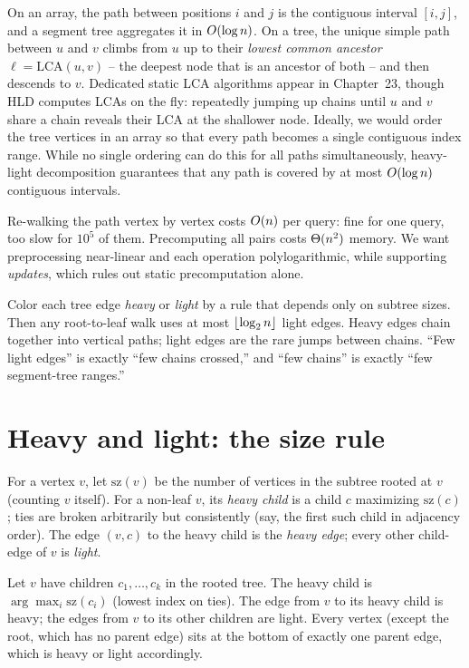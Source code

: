 \begin{intuitionbox}
On an array, the path between positions $i$ and $j$ is the contiguous interval $[i,j]$, and a segment tree aggregates it in $O(\log n)$. On a tree, the unique simple path between $u$ and $v$ climbs from $u$ up to their \emph{lowest common ancestor} $\ell=\mathrm{LCA}(u,v)$ -- the deepest node that is an ancestor of both -- and then descends to $v$. Dedicated static LCA algorithms appear in Chapter~23, though HLD computes LCAs on the fly: repeatedly jumping up chains until $u$ and $v$ share a chain reveals their LCA at the shallower node. Ideally, we would order the tree vertices in an array so that every path becomes a single contiguous index range. While no single ordering can do this for all paths simultaneously, heavy-light decomposition guarantees that any path is covered by at most $O(\log n)$ contiguous intervals.
\end{intuitionbox}

Re-walking the path vertex by vertex costs $O(n)$ per query: fine
for one query, too slow for $10^5$ of them. Precomputing all pairs costs $\Theta(n^2)$ memory. We want
preprocessing near-linear and each operation polylogarithmic, while supporting \emph{updates}, which
rules out static precomputation alone.

\begin{focusbox}
Color each tree edge \emph{heavy} or \emph{light} by
a rule that depends only on subtree sizes. Then any root-to-leaf walk uses at most
$\lfloor\log_2 n\rfloor$ light edges. Heavy edges chain together into vertical paths; light edges are the
rare jumps between chains. ``Few light edges'' is exactly ``few chains crossed,'' and ``few chains''
is exactly ``few segment-tree ranges.''
\end{focusbox}

\section{Heavy and light: the size rule}
\label{ch19:rule}

For a vertex $v$, let $\mathrm{sz}(v)$ be the number of vertices in the subtree rooted at $v$
(counting $v$ itself). For a non-leaf $v$, its \emph{heavy child} is a child $c$ maximizing
$\mathrm{sz}(c)$; ties are broken arbitrarily but consistently (say, the first such child in adjacency
order). The edge $(v,c)$ to the heavy child is the \emph{heavy edge}; every other child-edge of $v$
is \emph{light}.

\begin{definition}
\label{ch19:def-heavy}
Let $v$ have children $c_1,\dots,c_k$ in the rooted tree. The heavy child is
$\arg\max_i \mathrm{sz}(c_i)$ (lowest index on ties). The edge from $v$ to its heavy child is heavy;
the edges from $v$ to its other children are light. Every vertex (except the root, which has no parent
edge) sits at the bottom of exactly one parent edge, which is heavy or light accordingly.
\end{definition}

